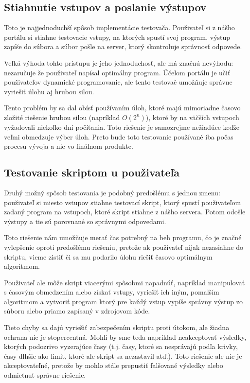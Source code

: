 \subsection{Stiahnutie vstupov a poslanie výstupov}
\label{testovac1}
Toto je najjednoduchší spôsob implementácie testovača. Použivateľ si z nášho portálu si stiahne testovacie vstupy, na ktorých spustí
svoj program, výstup zapíše do súbora a súbor pošle na server, ktorý skontroluje správnosť odpovede.

 Veľká výhoda tohto prístupu je jeho jednoduchosť, ale má značnú nevýhodu: nezaručuje že použivateľ napísal optimálny program.
Účelom portálu je učiť použivateľov dynamické programovanie, ale tento testovač umožňuje správne vyriešiť úlohu aj hrubou silou.

Tento problém by sa dal obísť používaním úloh, ktoré majú mimoriadne časovo zložité riešenie hrubou silou (napríklad \(O(2^n)\)), ktoré by na väčších vstupoch
vyžadovali niekoľko dní počítania.
Toto riešenie je samozrejme nežiadúce keďže veľmi obmedzuje výber úloh. Preto bude toto testovanie používané iba počas procesu vývoja a nie vo finálnom produkte.

\subsection{Testovanie skriptom u použivateľa}

\label{testovac2}
Druhý možný spôsob testovania je podobný predošlému s jednou zmenu: použivateľ si miesto vstupov stiahne testovací skript, ktorý spustí použivateľom zadaný program
na vstupoch, ktoré skript stiahne z nášho servera. Potom odošle výstupy a tie sú porovnané so správnymi odpoveďami.

Toto riešenie nám umožňuje merať čas potrebný na beh programu, čo je značné vylepšenie oproti predošlému riešeniu, pretože ak použivateľ nijak nezasiahne
do skriptu, vieme zistiť či sa mu podarilo úlohu riešiť časovo optimálnym algoritmom.

Použivateľ ale môže skript viacerými spôsobmi napadnúť, napríklad manipulovať s časovým obmedzením alebo získať vstupy, vyriešiť ich iným, pomalším algoritmom a
vytvoriť program ktorý pre každý vstup vypíše správny výstup zo súboru alebo priamo zapísaný v zdrojovom kóde.

Tieto chyby sa dajú vyriešiť zabezpečením skriptu proti útokom, ale žiadna ochrana nie je stopercentná. Mohli by sme teda napríklad neakceptovať výsledky, ktorých podozrivo vyzerajúce
časy (t.j. časy, ktoré sa nesprávajú podľa krivky, časy dlhšie ako limit, ktoré ale skript sa nezastavil atď.). Toto riešenie ale nie je akceptovateľné, pretože by mohlo stále prepustiť
falšované výsledky alebo odmietnuť správne riešenie.

